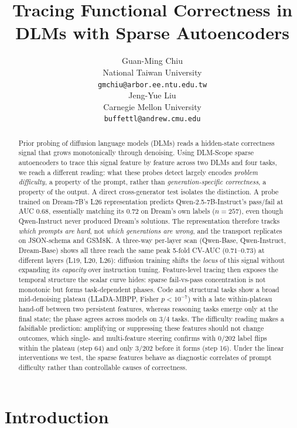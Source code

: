 \documentclass[11pt]{article}
\title{Tracing Functional Correctness in DLMs with Sparse Autoencoders}
\author{Guan-Ming Chiu \\
  National Taiwan University \\
  \texttt{gmchiu@arbor.ee.ntu.edu.tw} \\\And
  Jeng-Yue Liu \\
  Carnegie Mellon University \\
  \texttt{buffettl@andrew.cmu.edu} \\}
\begin{document}
\maketitle
\raggedbottom

\begin{abstract}
Prior probing of diffusion language models (DLMs) reads a hidden-state correctness signal that grows monotonically through denoising.
Using DLM-Scope sparse autoencoders to trace this signal feature by feature across two DLMs and four tasks, we reach a different reading: what these probes detect largely encodes \emph{problem difficulty}, a property of the prompt, rather than \emph{generation-specific correctness}, a property of the output.
A direct cross-generator test isolates the distinction. A probe trained on Dream-7B's L26 representation predicts Qwen-2.5-7B-Instruct's pass/fail at AUC $0.68$, essentially matching its $0.72$ on Dream's own labels ($n{=}257$), even though Qwen-Instruct never produced Dream's solutions. The representation therefore tracks \emph{which prompts are hard}, not \emph{which generations are wrong}, and the transport replicates on JSON-schema and GSM8K.
A three-way per-layer scan (Qwen-Base, Qwen-Instruct, Dream-Base) shows all three reach the same peak 5-fold CV-AUC ($0.71$--$0.73$) at different layers (L19, L20, L26): diffusion training shifts the \emph{locus} of this signal without expanding its \emph{capacity} over instruction tuning.
Feature-level tracing then exposes the temporal structure the scalar curve hides: sparse fail-vs-pass concentration is not monotonic but forms task-dependent phases. Code and structural tasks show a broad mid-denoising plateau (LLaDA-MBPP, Fisher $p\!<\!10^{-7}$) with a late within-plateau hand-off between two persistent features, whereas reasoning tasks emerge only at the final state; the phase agrees across models on $3/4$ tasks.
The difficulty reading makes a falsifiable prediction: amplifying or suppressing these features should not change outcomes, which single- and multi-feature steering confirms with $0/202$ label flips within the plateau (step 64) and only $3/202$ before it forms (step 16).
Under the linear interventions we test, the sparse features behave as diagnostic correlates of prompt difficulty rather than controllable causes of correctness.
\end{abstract}

\section{Introduction}
\end{document}
